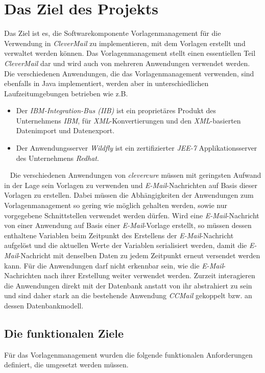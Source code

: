 \chapter{Das Ziel des Projekts}
\label{cha:Zielsetzung}
Das Ziel ist es, die Softwarekomponente Vorlagenmanagement für die Verwendung in \emph{CleverMail} zu implementieren, mit dem Vorlagen erstellt und verwaltet werden können. Das Vorlagenmanagement stellt einen essentiellen Teil \emph{CleverMail} dar und wird auch von mehreren Anwendungen verwendet werden. Die verschiedenen Anwendungen, die das Vorlagenmanagement verwenden, sind ebenfalls in Java implementiert, werden aber in unterschiedlichen Laufzeitumgebungen betrieben wie z.B.
\begin{itemize}
	\item Der \emph{IBM-Integration-Bus (IIB)}
	\newline
	ist ein proprietäres Produkt des Unternehmens \emph{IBM}, für \emph{XML}-Konvertierungen und den \emph{XML}-basierten Datenimport und Datenexport.
	\item Der Anwendungsserver \emph{Wildfly}
	\newline
	ist ein zertifizierter \emph{JEE-7} Applikationsserver des Unternehmens \emph{Redhat}.
\end{itemize} 
\ \newline
Die verschiedenen Anwendungen von \emph{clevercure} müssen mit geringsten Aufwand in der Lage sein Vorlagen zu verwenden und \emph{E-Mail}-Nachrichten auf Basis dieser Vorlagen zu erstellen. Dabei müssen die Abhängigkeiten der Anwendungen zum Vorlagenmanagement so gering wie möglich gehalten werden, sowie nur vorgegebene Schnittstellen verwendet werden dürfen. Wird eine \emph{E-Mail}-Nachricht von einer Anwendung auf Basis einer \emph{E-Mail}-Vorlage erstellt, so müssen dessen enthaltene Variablen beim Zeitpunkt des Erstellens der \emph{E-Mail}-Nachricht aufgelöst und die aktuellen Werte der Variablen serialisiert werden, damit die \emph{E-Mail}-Nachricht mit denselben Daten zu jedem Zeitpunkt erneut versendet werden kann. Für die Anwendungen darf nicht erkennbar sein, wie die \emph{E-Mail}-Nachrichten nach ihrer Erstellung weiter verwendet werden. Zurzeit interagieren die Anwendungen direkt mit der Datenbank anstatt von ihr abstrahiert zu sein und sind daher stark an die bestehende Anwendung \emph{CCMail} gekoppelt bzw. an dessen Datenbankmodell.
\newpage

\section{Die funktionalen Ziele}
Für das Vorlagenmanagement wurden die folgende funktionalen Anforderungen definiert, die umgesetzt werden müssen.

